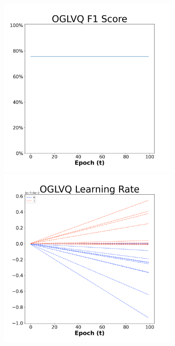 \begin{figure}[H]
  \centering %
\begin{subfigure}{0.3\textwidth}
\includegraphics[width=\linewidth]{images/exper2/NSP/OGLVQ_0.01_f1.png}
  \includegraphics[width=\linewidth]{images/exper2/NSP/OGLVQ_0.01_lr.png}

\end{subfigure}
\end{figure}
